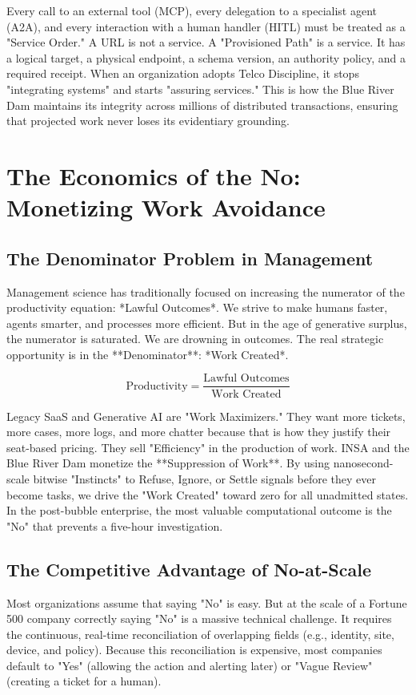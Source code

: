 \documentclass[12pt,a4paper,oneside]{book}
\begin{document}
Every call to an external tool (MCP), every delegation to a specialist agent (A2A), and every interaction with a human handler (HITL) must be treated as a "Service Order." A URL is not a service. A "Provisioned Path" is a service. It has a logical target, a physical endpoint, a schema version, an authority policy, and a required receipt. When an organization adopts Telco Discipline, it stops "integrating systems" and starts "assuring services." This is how the Blue River Dam maintains its integrity across millions of distributed transactions, ensuring that projected work never loses its evidentiary grounding.

\chapter{The Economics of the No: Monetizing Work Avoidance}

\section{The Denominator Problem in Management}
Management science has traditionally focused on increasing the numerator of the productivity equation: *Lawful Outcomes*. We strive to make humans faster, agents smarter, and processes more efficient. But in the age of generative surplus, the numerator is saturated. We are drowning in outcomes. The real strategic opportunity is in the **Denominator**: *Work Created*.

\begin{equation}
\text{Productivity} = \frac{\text{Lawful Outcomes}}{\text{Work Created}}
\end{equation}

Legacy SaaS and Generative AI are "Work Maximizers." They want more tickets, more cases, more logs, and more chatter because that is how they justify their seat-based pricing. They sell "Efficiency" in the production of work. INSA and the Blue River Dam monetize the **Suppression of Work**. By using nanosecond-scale bitwise "Instincts" to Refuse, Ignore, or Settle signals before they ever become tasks, we drive the "Work Created" toward zero for all unadmitted states. In the post-bubble enterprise, the most valuable computational outcome is the "No" that prevents a five-hour investigation.

\section{The Competitive Advantage of No-at-Scale}
Most organizations assume that saying "No" is easy. But at the scale of a Fortune 500 company correctly saying "No" is a massive technical challenge. It requires the continuous, real-time reconciliation of overlapping fields (e.g., identity, site, device, and policy). Because this reconciliation is expensive, most companies default to "Yes" (allowing the action and alerting later) or "Vague Review" (creating a ticket for a human). 
\end{document}
